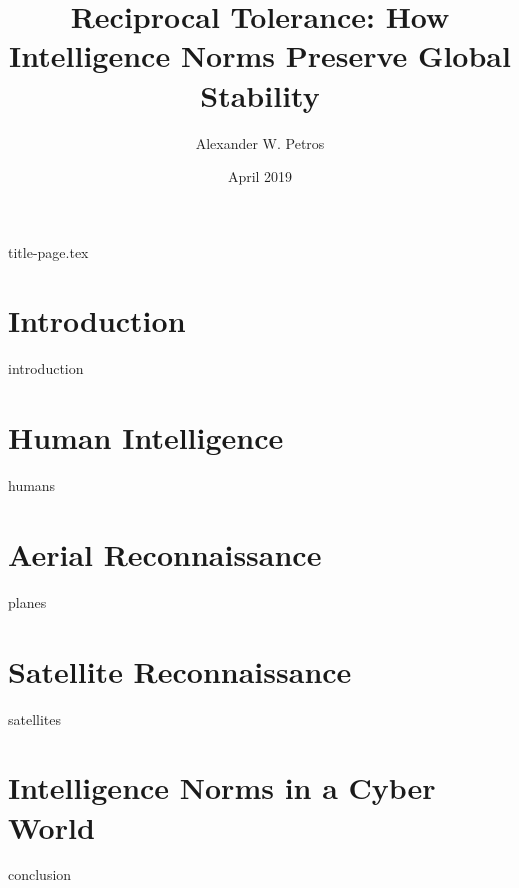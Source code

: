 \documentclass{memoir}
\title{Reciprocal Tolerance: How Intelligence Norms Preserve Global Stability}
\author{Alexander W. Petros}
\date{April 2019}
\begin{document}
    \frontmatter
    {title-page.tex}

    \tableofcontents
    \newpage
    \thispagestyle{empty}

    \listoffigures
    \listoftables
    \newpage


    \mainmatter
    \chapter{Introduction}
    {introduction}

    \chapter{Human Intelligence}
    {humans}

    \chapter{Aerial Reconnaissance}
    {planes}

    \chapter{Satellite Reconnaissance}
    {satellites}

    \chapter{Intelligence Norms in a Cyber World}
    {conclusion}
\end{document}
